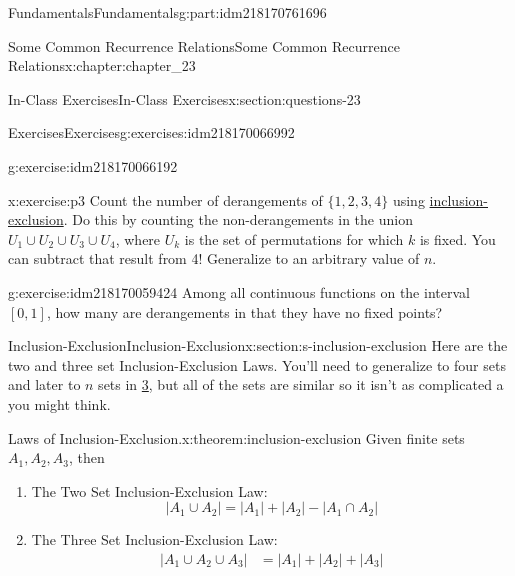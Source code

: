 \documentclass[oneside,10pt,]{book}
\numberwithin{equation}{section}
\begin{document}
\begin{partptx}{Fundamentals}{}{Fundamentals}{}{}{g:part:idm218170761696}
\begin{chapterptx}{Some Common Recurrence Relations}{}{Some Common Recurrence Relations}{}{}{x:chapter:chapter_23}
\begin{sectionptx}{In-Class Exercises}{}{In-Class Exercises}{}{}{x:section:questions-23}
\begin{exercises-subsection-numberless}{Exercises}{}{Exercises}{}{}{g:exercises:idm218170066992}
\begin{exercisegroup}
\begin{divisionexerciseeg}{2}{}{}{g:exercise:idm218170066192}
\end{divisionexerciseeg}%
\begin{divisionexerciseeg}{3}{}{}{x:exercise:p3}%
Count the number of derangements of \(\{1,2,3,4\}\) using \hyperref[x:section:s-inclusion-exclusion]{inclusion-exclusion}. Do this by counting the non-derangements in the union \(U_1 \cup U_2 \cup U_3 \cup U_4\), where \(U_k\) is the set of permutations for which \(k\) is fixed. You can subtract that result from 4!   Generalize to an arbitrary value of \(n\).%
\end{divisionexerciseeg}%
\begin{divisionexerciseeg}{4}{}{}{g:exercise:idm218170059424}%
Among all continuous functions on the interval \([0,1]\), how many are derangements in that they have no fixed points?%
\end{divisionexerciseeg}%
\end{exercisegroup}
\par\medskip\noindent
\end{exercises-subsection-numberless}
\end{sectionptx}
%
%
\typeout{************************************************}
\typeout{************************************************}
%
\begin{sectionptx}{Inclusion-Exclusion}{}{Inclusion-Exclusion}{}{}{x:section:s-inclusion-exclusion}
Here are the two and three set Inclusion-Exclusion Laws. You'll need to generalize to four sets and later to \(n\) sets in \hyperlink{x:exercise:p3}{3}, but all of the sets are similar so it isn't as complicated a you might think.%
\begin{theorem}{Laws of Inclusion-Exclusion.}{}{x:theorem:inclusion-exclusion}%
%
Given finite sets \(A_1, A_2, A_3\), then%
\begin{enumerate}[label=(\alph*)]
\item\hypertarget{x:li:ie2}{}The Two Set Inclusion-Exclusion Law:%
\begin{equation*}
\lvert A_1 \cup A_2 \rvert =\lvert A_1 \rvert + \lvert A_2 \rvert - \lvert A_1 \cap A_2 \rvert  
\end{equation*}
%
\item\hypertarget{x:li:ie3}{}The Three Set Inclusion-Exclusion Law:%
\begin{equation*}
\begin{split}
\lvert A_1 \cup A_2 \cup A_3 \rvert & =\lvert A_1 \rvert + \lvert A_2 \rvert + \lvert A_3 \rvert\\

\end{split}
\end{equation*}
\end{enumerate}
\end{theorem}
\end{sectionptx}
\end{chapterptx}
\end{partptx}
\end{document}
